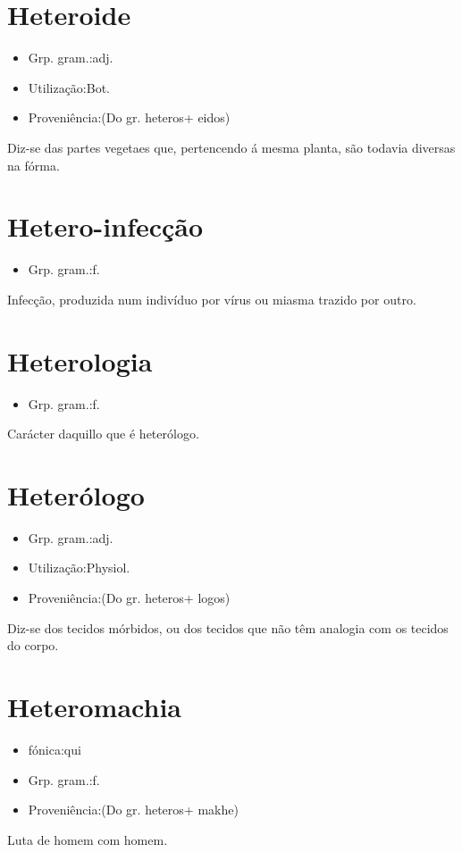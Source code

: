 \documentclass{article}
\begin{document}
\section{Heteroide}
\begin{itemize}
\item {Grp. gram.:adj.}
\end{itemize}
\begin{itemize}
\item {Utilização:Bot.}
\end{itemize}
\begin{itemize}
\item {Proveniência:(Do gr. \textunderscore heteros\textunderscore  + \textunderscore eidos\textunderscore )}
\end{itemize}
Diz-se das partes vegetaes que, pertencendo á mesma planta, são todavia diversas na fórma.
\section{Hetero-infecção}
\begin{itemize}
\item {Grp. gram.:f.}
\end{itemize}
Infecção, produzida num indivíduo por vírus ou miasma trazido por outro.
\section{Heterologia}
\begin{itemize}
\item {Grp. gram.:f.}
\end{itemize}
Carácter daquillo que é heterólogo.
\section{Heterólogo}
\begin{itemize}
\item {Grp. gram.:adj.}
\end{itemize}
\begin{itemize}
\item {Utilização:Physiol.}
\end{itemize}
\begin{itemize}
\item {Proveniência:(Do gr. \textunderscore heteros\textunderscore  + \textunderscore logos\textunderscore )}
\end{itemize}
Diz-se dos tecidos mórbidos, ou dos tecidos que não têm analogia com os tecidos do corpo.
\section{Heteromachia}
\begin{itemize}
\item {fónica:qui}
\end{itemize}
\begin{itemize}
\item {Grp. gram.:f.}
\end{itemize}
\begin{itemize}
\item {Proveniência:(Do gr. \textunderscore heteros\textunderscore  + \textunderscore makhe\textunderscore )}
\end{itemize}
Luta de homem com homem.
\end{document}
